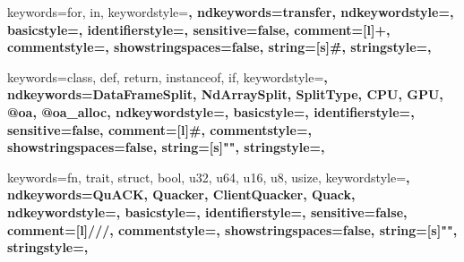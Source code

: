 \usepackage[compact]{titlesec}
\usepackage{booktabs}
\usepackage{enumitem}
\usepackage{xspace}

\usepackage{subcaption}
\usepackage{float}
\usepackage{cleveref}
\usepackage{amssymb}
\usepackage{tcolorbox}
\usepackage{stfloats}
\usepackage[section]{placeins}

\usepackage[scaled=0.85]{beramono}
\usepackage{listings}
\usepackage{hyperref}
\usepackage[dvipsnames]{xcolor}

\def\lstfloatautorefname{Listing} %

\makeatletter
\newcommand{\nospaceS}{\S\@gobble}
\makeatother
\Crefname{section}{\nospaceS}{\nospaceS}

\newcommand\code[1]{\lstinline$#1$}

 {
 keywords={for, in},
 keywordstyle=\color{BrickRed}\bfseries,
 ndkeywords={transfer},
 ndkeywordstyle=\color{NavyBlue}\bfseries,
 basicstyle=\footnotesize\ttfamily,
 identifierstyle=\color{black},
 sensitive=false,
 comment=[l]{+},
 commentstyle=\color{ForestGreen}\ttfamily\bfseries,
 showstringspaces=false,
 string=[s]{\#}{\.},
 stringstyle=\color{gray}\ttfamily,
}

 {
 keywords={class, def, return, instanceof, if},
 keywordstyle=\color{BrickRed}\bfseries,
 ndkeywords={DataFrameSplit, NdArraySplit, SplitType, CPU, GPU, @oa, @oa_alloc},
 ndkeywordstyle=\color{NavyBlue}\bfseries,
 basicstyle=\footnotesize\ttfamily,
 identifierstyle=\color{black},
 sensitive=false,
 comment=[l]{\#},
 commentstyle=\color{gray}\ttfamily\bfseries,
 showstringspaces=false,
 string=[s]{"}{"},
 stringstyle=\color{ForestGreen}\ttfamily,
}

 {
 keywords={fn, trait, struct, bool, u32, u64, u16, u8, usize},
 keywordstyle=\color{BrickRed}\bfseries,
 ndkeywords={QuACK, Quacker, ClientQuacker, Quack},
 ndkeywordstyle=\color{NavyBlue}\bfseries,
 basicstyle=\footnotesize\ttfamily,
 identifierstyle=\color{black},
 sensitive=false,
 comment=[l]{///},
 commentstyle=\color{gray}\ttfamily\bfseries,
 showstringspaces=false,
 string=[s]{"}{"},
 stringstyle=\color{ForestGreen}\ttfamily,
}

\lstset{language=Python}

\renewcommand{\topfraction}{0.95}
\renewcommand{\bottomfraction}{0.95}
\renewcommand{\textfraction}{0.05}
\renewcommand{\floatpagefraction}{0.95}

